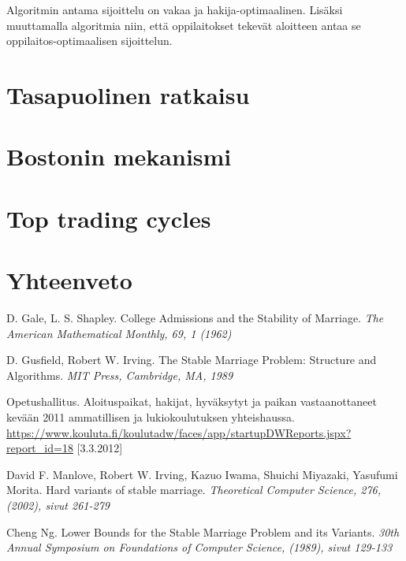 \documentclass[gradu, twoside]{tktltiki}
\begin{document}
Algoritmin antama sijoittelu on vakaa ja hakija-optimaalinen. Lisäksi
muuttamalla algoritmia niin, että oppilaitokset tekevät aloitteen
antaa se oppilaitos-optimaalisen sijoittelun.\cite{galeshapley62}

\section{Tasapuolinen ratkaisu}

\section{Bostonin mekanismi}

\section{Top trading cycles}

\section{Yhteenveto}

\newpage
\begin{thebibliography}{XXX99}

  D. Gale, L. S. Shapley.
  College Admissions and the Stability of Marriage.
  \emph{The American Mathematical Monthly, 69, 1 (1962)}

  D. Gusfield, Robert W. Irving.
  The Stable Marriage Problem: Structure and Algorithms.
  \emph{MIT Press, Cambridge, MA, 1989}

  Opetushallitus.
  Aloituspaikat, hakijat, hyväksytyt ja paikan vastaanottaneet
  kevään 2011 ammatillisen ja lukiokoulutuksen yhteishaussa.
  \url{https://www.kouluta.fi/koulutadw/faces/app/startupDWReports.jspx?report_id=18}
      [3.3.2012]

  David F. Manlove, Robert W. Irving, Kazuo Iwama, Shuichi Miyazaki,
  Yasufumi Morita.
  Hard variants of stable marriage.
  \emph{Theoretical Computer Science, 276, (2002), sivut 261-279}

  Cheng Ng.
  Lower Bounds for the Stable Marriage Problem and its Variants.
  \emph{30th Annual Symposium on Foundations of Computer Science,
    (1989), sivut 129-133}

\end{thebibliography}
\end{document}
